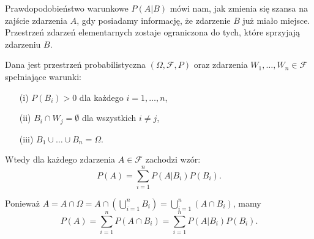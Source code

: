 \documentclass[final,a4paper,openany,12pt]{mwbk}
\begin{document}
Prawdopodobieństwo warunkowe $P(A|B)$ mówi nam, jak zmienia się szansa na zajście zdarzenia $A$, gdy posiadamy informację, że zdarzenie $B$ już miało miejsce. Przestrzeń zdarzeń elementarnych zostaje ograniczona do tych, które sprzyjają zdarzeniu $B$.


\begin{Tw}
Dana jest przestrzeń probabilistyczna $(\Omega, \mathcal{F}, P)$ oraz zdarzenia $W_1, \dots, W_n \in \mathcal{F}$ spełniające warunki:
\begin{enumerate}
    \item[(i)] $P(B_i) > 0$ dla każdego $i = 1, \dots, n$,
    \item[(ii)] $B_i \cap W_j = \emptyset$ dla wszystkich $i \neq j$,
    \item[(iii)] $B_1 \cup \dots \cup B_n = \Omega$.
\end{enumerate}
Wtedy dla każdego zdarzenia $A \in \mathcal{F}$ zachodzi wzór:
\[
P(A) = \sum_{i=1}^{n} P(A|B_i)P(B_i).
\]
\end{Tw}
\begin{Dow}
    Ponieważ $A = A \cap \Omega = A \cap (\bigcup_{i=1}^{n} B_i) = \bigcup_{i=1}^{n} (A \cap B_i)$, mamy
\[
P(A) = \sum_{i=1}^{n} P(A \cap B_i) = \sum_{i=1}^{n} P(A|B_i)P(B_i).
\]
\end{Dow}
\end{document}
